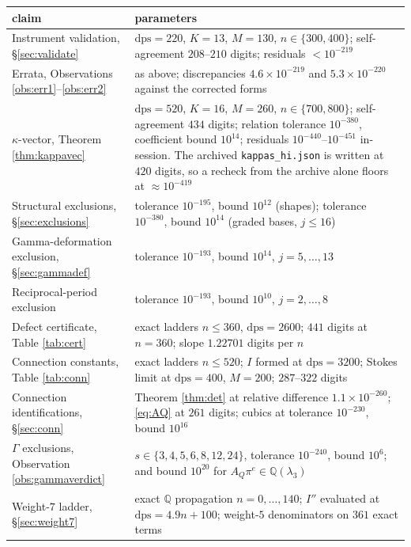 \documentclass[11pt,reqno]{amsart}
\theoremstyle{plain}
\theoremstyle{definition}
\theoremstyle{remark}
\newcommand{\QQ}{\mathbb{Q}}
\newcommand{\dps}{\mathrm{dps}}
\begin{document}
\begin{center}
\small
\begin{tabular}{p{}p{}}
\toprule
claim & parameters \\
\midrule
Instrument validation, \S\ref{sec:validate} &
  $\dps=220$, $K=13$, $M=130$, $n\in\{300,400\}$; self-agreement $208$--$210$ digits;
  residuals $<10^{-219}$ \\
Errata, Observations \ref{obs:err1}--\ref{obs:err2} &
  as above; discrepancies $4.6\times10^{-219}$ and $5.3\times10^{-220}$ against the corrected
  forms \\
$\kappa$-vector, Theorem \ref{thm:kappavec} &
  $\dps=520$, $K=16$, $M=260$, $n\in\{700,800\}$; self-agreement $434$ digits; relation
  tolerance $10^{-380}$, coefficient bound $10^{14}$; residuals $10^{-440}$--$10^{-451}$
  in-session. The archived \texttt{kappas\_hi.json} is written at $420$ digits, so a recheck
  from the archive alone floors at $\approx10^{-419}$ \\
Structural exclusions, \S\ref{sec:exclusions} &
  tolerance $10^{-195}$, bound $10^{12}$ (shapes); tolerance $10^{-380}$, bound $10^{14}$
  (graded bases, $j\le16$) \\
Gamma-deformation exclusion, \S\ref{sec:gammadef} &
  tolerance $10^{-193}$, bound $10^{14}$, $j=5,\dots,13$ \\
Reciprocal-period exclusion &
  tolerance $10^{-193}$, bound $10^{10}$, $j=2,\dots,8$ \\
Defect certificate, Table \ref{tab:cert} &
  exact ladders $n\le360$, $\dps=2600$; $441$ digits at $n=360$; slope $1.22701$ digits per $n$ \\
Connection constants, Table \ref{tab:conn} &
  exact ladders $n\le520$; $I$ formed at $\dps=3200$; Stokes limit at $\dps=400$, $M=200$;
  $287$--$322$ digits \\
Connection identifications, \S\ref{sec:conn} &
  Theorem \ref{thm:det} at relative difference $1.1\times10^{-260}$; \eqref{eq:AQ} at $261$
  digits; cubics at tolerance $10^{-230}$, bound $10^{16}$ \\
$\Gamma$ exclusions, Observation \ref{obs:gammaverdict} &
  $s\in\{3,4,5,6,8,12,24\}$, tolerance $10^{-240}$, bound $10^{6}$; and bound $10^{20}$ for
  $A_Q\pi^{e}\in\QQ(\lambda_3)$ \\
Weight-$7$ ladder, \S\ref{sec:weight7} &
  exact $\QQ$ propagation $n=0,\dots,140$; $I''$ evaluated at $\dps=4.9n+100$; weight-$5$
  denominators on $361$ exact terms \\
\bottomrule
\end{tabular}
\end{center}
\end{document}
